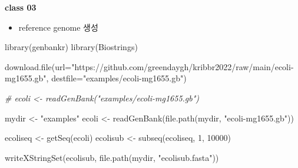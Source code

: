 \documentclass[
]{book}
\newenvironment{Shaded}{\begin{snugshade}}{\end{snugshade}}
\newcommand{\AttributeTok}[1]{\textcolor[rgb]{0.77,0.63,0.00}{#1}}
\newcommand{\CommentTok}[1]{\textcolor[rgb]{0.56,0.35,0.01}{\textit{#1}}}
\newcommand{\ControlFlowTok}[1]{\textcolor[rgb]{0.13,0.29,0.53}{\textbf{#1}}}
\newcommand{\DecValTok}[1]{\textcolor[rgb]{0.00,0.00,0.81}{#1}}
\newcommand{\FunctionTok}[1]{\textcolor[rgb]{0.00,0.00,0.00}{#1}}
\newcommand{\NormalTok}[1]{#1}
\newcommand{\OtherTok}[1]{\textcolor[rgb]{0.56,0.35,0.01}{#1}}
\newcommand{\SpecialCharTok}[1]{\textcolor[rgb]{0.00,0.00,0.00}{#1}}
\newcommand{\StringTok}[1]{\textcolor[rgb]{0.31,0.60,0.02}{#1}}
\providecommand{\tightlist}{%
  \setlength{\itemsep}{0pt}\setlength{\parskip}{0pt}}
\begin{document}
\begin{Shaded}
\end{Shaded}

\textbf{class 03}

\begin{itemize}
\tightlist
\item
  reference genome 생성
\end{itemize}

\begin{Shaded}
\begin{Highlighting}[]
\FunctionTok{library}\NormalTok{(genbankr)}
\FunctionTok{library}\NormalTok{(Biostrings)}

\FunctionTok{download.file}\NormalTok{(}\AttributeTok{url=}\StringTok{"https://github.com/greendaygh/kribbr2022/raw/main/ecoli{-}mg1655.gb"}\NormalTok{, }\AttributeTok{destfile=}\StringTok{"examples/ecoli{-}mg1655.gb"}\NormalTok{)}

\CommentTok{\# ecoli \textless{}{-} readGenBank("examples/ecoli{-}mg1655.gb")}

\NormalTok{mydir }\OtherTok{\textless{}{-}} \StringTok{"examples"}
\NormalTok{ecoli }\OtherTok{\textless{}{-}} \FunctionTok{readGenBank}\NormalTok{(}\FunctionTok{file.path}\NormalTok{(mydir, }\StringTok{"ecoli{-}mg1655.gb"}\NormalTok{))}

\NormalTok{ecoliseq }\OtherTok{\textless{}{-}} \FunctionTok{getSeq}\NormalTok{(ecoli)}
\NormalTok{ecolisub }\OtherTok{\textless{}{-}} \FunctionTok{subseq}\NormalTok{(ecoliseq, }\DecValTok{1}\NormalTok{, }\DecValTok{10000}\NormalTok{)}

\FunctionTok{writeXStringSet}\NormalTok{(ecolisub, }\FunctionTok{file.path}\NormalTok{(mydir, }\StringTok{"ecolisub.fasta"}\NormalTok{))}
\end{Highlighting}
\end{Shaded}
\end{document}
